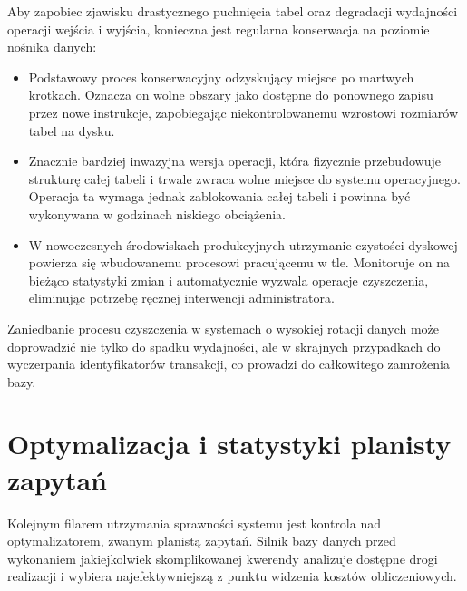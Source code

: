 \documentclass[letterpaper,10pt,english]{sphinxmanual}
\begin{document}
\sphinxAtStartPar
Aby zapobiec zjawisku drastycznego puchnięcia tabel oraz degradacji wydajności operacji wejścia i wyjścia, konieczna jest regularna konserwacja na poziomie nośnika danych:
\begin{itemize}
\item {} 
\sphinxAtStartPar
{} Podstawowy proces konserwacyjny odzyskujący miejsce po martwych krotkach. Oznacza on wolne obszary jako dostępne do ponownego zapisu przez nowe instrukcje, zapobiegając niekontrolowanemu wzrostowi rozmiarów tabel na dysku.

\item {} 
\sphinxAtStartPar
{} Znacznie bardziej inwazyjna wersja operacji, która fizycznie przebudowuje strukturę całej tabeli i trwale zwraca wolne miejsce do systemu operacyjnego. Operacja ta wymaga jednak zablokowania całej tabeli i powinna być wykonywana w godzinach niskiego obciążenia.

\item {} 
\sphinxAtStartPar
{} W nowoczesnych środowiskach produkcyjnych utrzymanie czystości dyskowej powierza się wbudowanemu procesowi pracującemu w tle. Monitoruje on na bieżąco statystyki zmian i automatycznie wyzwala operacje czyszczenia, eliminując potrzebę ręcznej interwencji administratora.

\end{itemize}

\sphinxAtStartPar
Zaniedbanie procesu czyszczenia w systemach o wysokiej rotacji danych może doprowadzić nie tylko do spadku wydajności, ale w skrajnych przypadkach do wyczerpania identyfikatorów transakcji, co prowadzi do całkowitego zamrożenia bazy.

\begin{sphinxVerbatim}[commandchars=\\\{\}]
\end{sphinxVerbatim}


\section{Optymalizacja i statystyki planisty zapytań}
\label{\detokenize{rozdzial_1/index:optymalizacja-i-statystyki-planisty-zapytan}}
\sphinxAtStartPar
Kolejnym filarem utrzymania sprawności systemu jest kontrola nad optymalizatorem, zwanym planistą zapytań. Silnik bazy danych przed wykonaniem jakiejkolwiek skomplikowanej kwerendy analizuje dostępne drogi realizacji i wybiera najefektywniejszą z punktu widzenia kosztów obliczeniowych.
\end{document}
